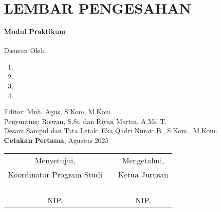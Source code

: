 \documentclass[../thesis.tex]{subfiles}
\begin{document}
\chapter*{LEMBAR PENGESAHAN}
\begin{center}
	\textbf{Modul Praktikum}\\
	{\MakeUppercase \Course}\\
	\CourseId
	\vspace{2\baselineskip}
	{\small Disusun Oleh:\\ }
	\begin{enumerate}%
		\centering
		\item  \Author
		\item  \ndAuthor
		\item  \rdAuthor
		\item  \thAuthor
	\end{enumerate}
	\vspace{3\baselineskip}
	Editor: Muh. Agus, S.Kom, M.Kom.\\
	Penyunting: Riswan, S.Si. dan Riyan Martin, A.Md.T.\\
	Desain Sampul dan Tata Letak: Eka Qadri Nurati B., S.Kom., M.Kom.\\
	\vspace{2\baselineskip}
	\textbf{Cetakan Pertama}, Agustus 2025
	\vspace{2\baselineskip}

	\begin{tabular}{@{}ccc@{}}
		Menyetujui,                       &    &  Mengetahui,  \\
		Koordinator Program Studi \Prodi  &    &  Ketua Jurusan \Fak  \\
		                                  &    &  \\
		                                  &    &  \\
		                                  &    &  \\
		{\bfseries\yourHead}              &    &  {\bfseries\yourSecHead}  \\

		NIP.\yourNipHead                  &    &  NIP. \yourNipSecHead  \\
	\end{tabular}

\end{center}

\end{document}
